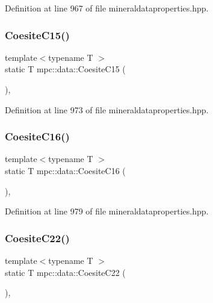 Definition at line 967 of file mineraldataproperties.\+hpp.

\mbox{\label{namespacempc_1_1data_a7654b43a0cd2f1e5e9cebc753538c9b0}} 
\subsubsection{\texorpdfstring{Coesite\+C15()}{CoesiteC15()}}
{\footnotesize\ttfamily template$<$typename T $>$ \\
static T mpc\+::data\+::\+Coesite\+C15 (\begin{DoxyParamCaption}{ }\end{DoxyParamCaption})\hspace{0.3cm}{\ttfamily [inline]}, {\ttfamily [static]}}



Definition at line 973 of file mineraldataproperties.\+hpp.

\mbox{\label{namespacempc_1_1data_aaa5dbc03d926e2983154883d2bbabdc8}} 
\subsubsection{\texorpdfstring{Coesite\+C16()}{CoesiteC16()}}
{\footnotesize\ttfamily template$<$typename T $>$ \\
static T mpc\+::data\+::\+Coesite\+C16 (\begin{DoxyParamCaption}{ }\end{DoxyParamCaption})\hspace{0.3cm}{\ttfamily [inline]}, {\ttfamily [static]}}



Definition at line 979 of file mineraldataproperties.\+hpp.

\mbox{\label{namespacempc_1_1data_a0e26b08e0f72e5e4bc3160e519051fd9}} 
\subsubsection{\texorpdfstring{Coesite\+C22()}{CoesiteC22()}}
{\footnotesize\ttfamily template$<$typename T $>$ \\
static T mpc\+::data\+::\+Coesite\+C22 (\begin{DoxyParamCaption}{ }\end{DoxyParamCaption})\hspace{0.3cm}{\ttfamily [inline]}, {\ttfamily [static]}}



